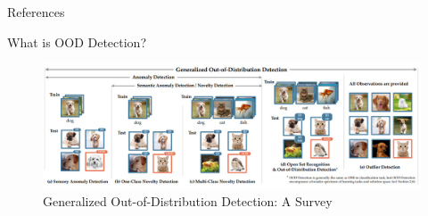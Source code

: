 \documentclass[aspectratio=169]{beamer}
\begin{document}
\begin{frame}[noframenumbering]{References}
    
    

\end{frame}

\begin{frame}[noframenumbering]{What is OOD Detection?}
    \begin{figure}
        \centering
        \includegraphics[scale=0.3]{images/OOD_ex_new.jpg}
        \caption{Generalized Out-of-Distribution Detection: A Survey}
        \label{fig:my_label}
    \end{figure}
\end{frame}
\end{document}
